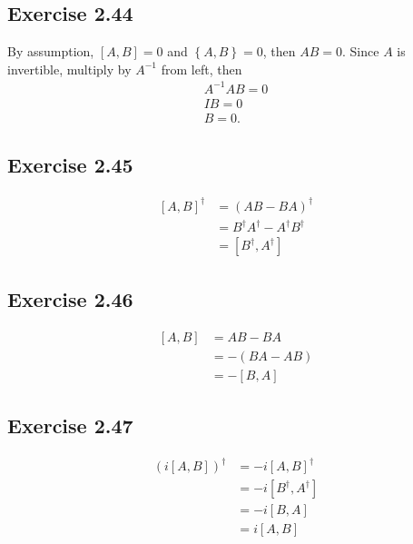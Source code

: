 \documentclass[a4paper,12pt]{article}
\begin{document}
\subsection*{Exercise 2.44}
By assumption, $\left[A, B\right] = 0$ and $\left\{A, B\right\} = 0$, then $AB = 0$.
Since $A$ is invertible, multiply by $A^{-1}$ from left, then
\begin{align*}
	A^{-1} AB = 0\\
	IB = 0\\
	B=0.
\end{align*}


\subsection*{Exercise 2.45}
\begin{align*}
	\left[A, B\right]^\dagger &= (AB -BA)^\dagger\\
		&= B^\dagger A^\dagger - A^\dagger B^\dagger\\
		&= \left[B^\dagger, A^\dagger \right]
\end{align*}



\subsection*{Exercise 2.46}
\begin{align*}
	\left[A, B\right] &= AB - BA\\
		&= - (BA - AB)\\
		&= -\left[B, A\right]
\end{align*}



\subsection*{Exercise 2.47}
\begin{align*}
	\left(i \left[A, B\right] \right)^\dagger &= -i \left[A, B\right]^\dagger\\
		&= -i \left[B^\dagger, A^\dagger \right]\\
		&= -i \left[B, A \right]\\
		&= i \left[A, B\right]
\end{align*}
\end{document}
